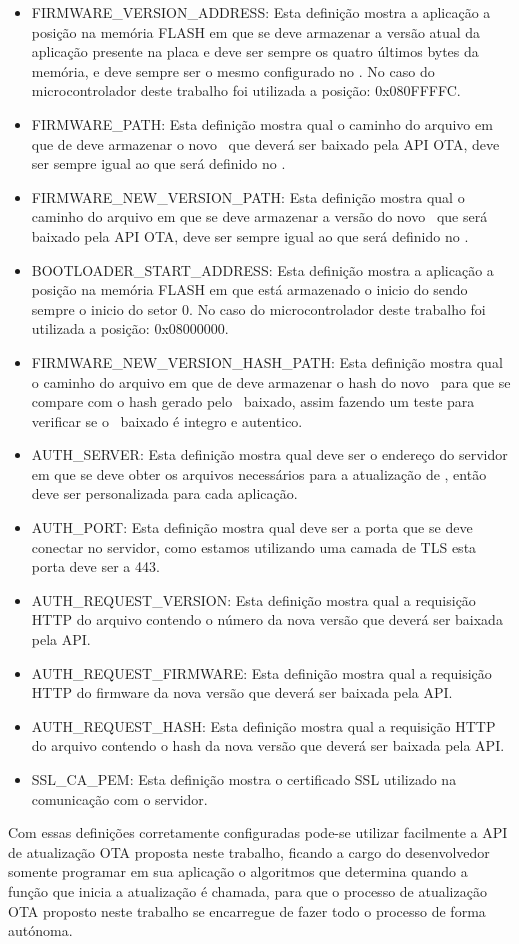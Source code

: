 \begin{itemize}
    \item FIRMWARE\_VERSION\_ADDRESS: Esta definição mostra a aplicação a posição na memória FLASH em que se deve armazenar a versão atual da aplicação presente na placa e deve ser sempre os quatro últimos bytes da memória, e deve sempre ser o mesmo configurado no \bootloader. No caso do microcontrolador deste trabalho foi utilizada a posição: 0x080FFFFC.
    \item FIRMWARE\_PATH: Esta definição mostra qual o caminho do arquivo em que de deve armazenar o novo \firmware\ que deverá ser baixado pela API OTA, deve ser sempre igual ao que será definido no \bootloader.
    \item FIRMWARE\_NEW\_VERSION\_PATH: Esta definição mostra qual o caminho do arquivo em que se deve armazenar a versão do novo \firmware\ que será baixado pela API OTA, deve ser sempre igual ao que será definido no \bootloader.
    \item BOOTLOADER\_START\_ADDRESS: Esta definição mostra a aplicação a posição na memória FLASH em que está armazenado o inicio do \bootloader sendo sempre o inicio do setor 0. No caso do microcontrolador deste trabalho foi utilizada a posição: 0x08000000.
    \item FIRMWARE\_NEW\_VERSION\_HASH\_PATH: Esta definição mostra qual o caminho do arquivo em que de deve armazenar o hash do novo \firmware\ para que se compare com o hash gerado pelo \firmware\ baixado, assim fazendo um teste para verificar se o \firmware\ baixado é integro e autentico.
    \item AUTH\_SERVER: Esta definição mostra qual deve ser o endereço do servidor em que se deve obter os arquivos necessários para a atualização de \firmware, então deve ser personalizada para cada aplicação.
    \item AUTH\_PORT: Esta definição mostra qual deve ser a porta que se deve conectar no servidor, como estamos utilizando uma camada de TLS esta porta deve ser a 443.
    \item AUTH\_REQUEST\_VERSION: Esta definição mostra qual a requisição HTTP do arquivo contendo o número da nova versão que deverá ser baixada pela API.
    \item AUTH\_REQUEST\_FIRMWARE: Esta definição mostra qual a requisição HTTP do firmware da nova versão que deverá ser baixada pela API.
    \item AUTH\_REQUEST\_HASH: Esta definição mostra qual a requisição HTTP do arquivo contendo o hash da nova versão que deverá ser baixada pela API.
    \item SSL\_CA\_PEM: Esta definição mostra o certificado SSL utilizado na comunicação com o servidor.
\end{itemize}

Com essas definições corretamente configuradas pode-se utilizar facilmente a API de atualização OTA proposta neste trabalho, ficando a cargo do desenvolvedor somente programar em sua aplicação o algoritmos que determina quando a função que inicia a atualização é chamada, para que o processo de atualização OTA proposto neste trabalho se encarregue de fazer todo o processo de forma autónoma. 

